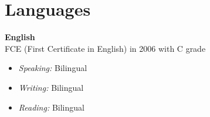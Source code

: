 \section{Languages}

\begin{large}
\textbf{English}\\


FCE (First Certificate in English) in 2006 with C grade
\end{large}
\begin{itemize}
\item \textit{Speaking:} Bilingual
\item \textit{Writing:} Bilingual
\item \textit{Reading:} Bilingual
\end{itemize}
